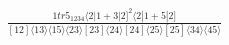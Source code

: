 \documentclass[varwidth, border=5pt]{standalone}
\begin{document}
\begin{my}
$\begin{gathered}
\scriptscriptstyle\frac{1tr5_{1234}⟨2|1+3|2]^2⟨2|1+5|2]}{[12]⟨13⟩⟨15⟩⟨23⟩[23]⟨24⟩[24]⟨25⟩[25]⟨34⟩⟨45⟩}
\end{gathered}$
\end{my}
\end{document}
